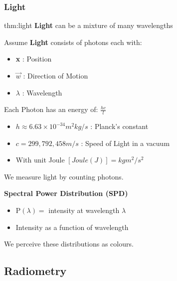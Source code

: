 \documentclass{article}
\begin{document}
\newpage

\subsubsection{Light}

\begin{defin}[Light]{thm:light}
    \textbf{Light} can be a mixture of many wavelengths

    \vspace{5px}

    Assume \textbf{Light} consists of photons each with:
    \begin{center}
        \begin{itemize}[label={--}, itemsep=-4px]
            \item \textbf{x} : Position
            \item \(\vec{w}\) : Direction of Motion
            \item \(\lambda\) : Wavelength
        \end{itemize}
    \end{center}

    Each Photon has an energy of: {\Large\(\frac{hc}{l}\)}

    \begin{itemize}[label={--}, itemsep=-4px]
        \item \(h \approx 6.63 \times 10^{-34} m^2 kg / s\) : Planck's constant
        \item \(c = 299,792,458m / s\) : Speed of Light in a vacuum
        \item With unit Joule \([Joule (J)] = kg m^2 / s^2\) 
    \end{itemize}
    We measure light by counting photons.
\end{defin}

\textbf{Spectral Power Distribution (SPD)}
\begin{itemize}[itemsep=-4px]
    \item \(\text{P}(\lambda) = \) intensity at wavelength \(\lambda\)
    \item Intensity as a function of wavelength
\end{itemize}

We perceive these distributions as colours.

\vspace{5px}

\subsection{Radiometry}
\end{document}

